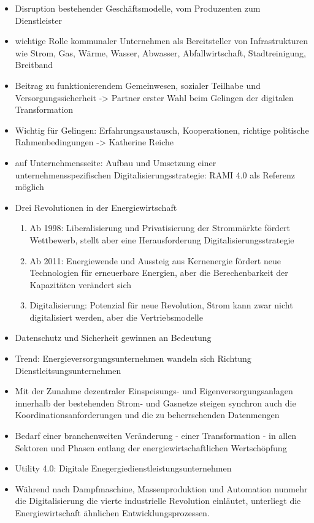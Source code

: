 \begin{itemize}
  \item Disruption bestehender Geschäftsmodelle, vom Produzenten zum Dienstleister \citep{Doleski2017}
  \item wichtige Rolle kommunaler Unternehmen als Bereitsteller von Infrastrukturen wie Strom, Gas, Wärme, Wasser, Abwasser, Abfallwirtschaft, Stadtreinigung, Breitband \citep{Doleski2017}
  \item Beitrag zu funktionierendem Gemeinwesen, sozialer Teilhabe und Versorgungssicherheit -> Partner erster Wahl beim Gelingen der digitalen Transformation
  \item Wichtig für Gelingen: Erfahrungsaustausch, Kooperationen, richtige politische Rahmenbedingungen -> Katherine Reiche
  \item auf Unternehmensseite: Aufbau und Umsetzung einer unternehmensspezifischen Digitalisierungsstrategie: RAMI 4.0 als Referenz möglich
  \item Drei Revolutionen in der Energiewirtschaft \citep{Doleski2017}
  \begin{enumerate}
    \item Ab 1998: Liberalisierung und Privatisierung der Strommärkte fördert Wettbewerb, stellt aber eine Herausforderung Digitalisierungsstrategie
    \item Ab 2011: Energiewende und Aussteig aus Kernenergie fördert neue Technologien für erneuerbare Energien, aber die Berechenbarkeit der Kapazitäten verändert sich
    \item Digitalisierung: Potenzial für neue Revolution, Strom kann zwar nicht digitalisiert werden, aber die Vertriebsmodelle
  \end{enumerate}
  \item Datenschutz und Sicherheit gewinnen an Bedeutung
  \item Trend: Energieversorgungsunternehmen wandeln sich Richtung Dienstleitsungsunternehmen
  \item \glqq Mit der Zunahme dezentraler Einspeisungs- und Eigenversorgungsanlagen innerhalb der bestehenden Strom- und Gasnetze steigen synchron auch die Koordinationsanforderungen und die zu beherrschenden Datenmengen \grqq{} \citep[S. 7]{Doleski2016}
  \item \glqq Bedarf einer branchenweiten Veränderung - einer Transformation - in allen Sektoren und Phasen entlang der energiewirtschaftlichen Wertschöpfung\grqq{} \cite[S. 11]{Doleski2016}
  \item Utility 4.0: Digitale Enegergiedienstleistungsunternehmen
  \item Während nach Dampfmaschine, Massenproduktion und Automation nunmehr die Digitalisierung die vierte industrielle Revolution einläutet, unterliegt die Energiewirtschaft ähnlichen Entwicklungsprozessen.
\end{itemize}

